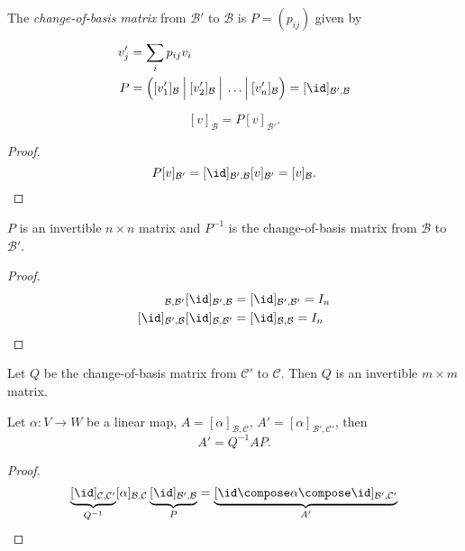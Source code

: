 \documentclass[a4paper]{article}
\newcommand*{\basis}{\mathcal}
\theoremstyle{definition}
\begin{document}
\begin{definition}
  The \emph{change-of-basis matrix} from \(\basis B'\) to \(\basis B\) is \(P = (p_{ij})\) given by
  \begin{align*}
    v_j' &= \sum_{i}^{ }p_{ij}v_i \\
    P &= \Big( [v_1']_{\basis B} \: \Big| \: [v_2']_{\basis B} \: \Big| \: \dots \Big| \: [v_n']_{\basis B} \Big) = [\id]_{\basis B', \basis B}
  \end{align*}
\end{definition}

\begin{lemma}
  \[
    [v]_{\basis B} = P[v]_{\basis B'}.
  \]
\end{lemma}

\begin{proof}
  \[
    P[v]_{\basis B'} = [\id]_{\basis B', \basis B}[v]_{\basis B'} = [v]_{\basis B}.
  \]
\end{proof}

\begin{lemma}
  \(P\) is an invertible \(n\times n\) matrix and \(P^{-1}\) is the change-of-basis matrix from \(\basis B\) to \(\basis B'\).
\end{lemma}

\begin{proof}
  \begin{align*}
    [\id]_{\basis B, \basis B'}[\id]_{\basis B', \basis B} &= [\id]_{\basis B', \basis B'} = I_n \\
    [\id]_{\basis B', \basis B}[\id]_{\basis B, \basis B'} &= [\id]_{\basis B, \basis B} = I_n
  \end{align*}
\end{proof}

Let \(Q\) be the change-of-basis matrix from \(\basis C'\) to \(\basis C\). Then \(Q\) is an invertible \(m\times m\) matrix.

\begin{proposition}
  Let \(\alpha: V\to W\) be a linear map, \(A = [\alpha]_{\basis B,\basis C}\), \(A' = [\alpha]_{\basis B',\basis C'}\), then
  \[
    A' = Q^{-1}AP.
  \]
\end{proposition}

\begin{proof}
  \[
    \underbrace{[\id]_{\basis C,\basis C'}}_{Q^{-1}} [\alpha]_{\basis B,\basis C} \underbrace{[\id]_{\basis B',\basis B}}_P = \underbrace{[\id\compose\alpha\compose\id]_{\basis B',\basis C'}}_{A'}
  \]
\end{proof}
\end{document}
